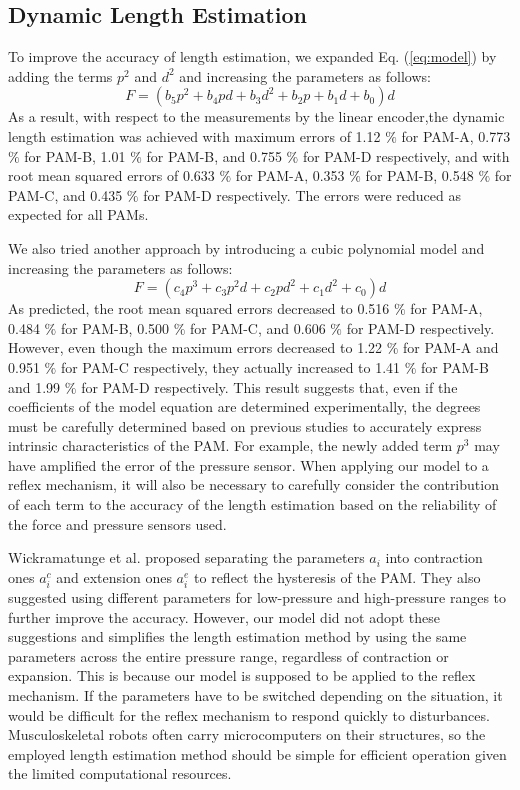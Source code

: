 \renewcommand{\thesubsection}{\Alph{subsection}}
\setcounter{subsection}{1} 
\subsection{Dynamic Length Estimation}
To improve the accuracy of length estimation, we expanded Eq. (\ref{eq:model}) by adding the terms $p^2$ and $d^2$ and increasing the parameters as follows:
\begin{equation}
\label{eq:model_2d(1)}
F = (b_5p^2 + b_4pd + b_3d^2 + b_2p+b_1d+b_0)d
\end{equation}
As a result, with respect to the measurements by the linear encoder,the dynamic length estimation was achieved with maximum errors of 1.12 $\%$ for PAM-A, 0.773 $\%$ for PAM-B, 1.01 $\%$ for PAM-B, and 0.755 $\%$ for PAM-D respectively, and with root mean squared errors of 0.633 $\%$ for PAM-A, 0.353 $\%$ for PAM-B, 0.548 $\%$ for PAM-C, and 0.435 $\%$ for PAM-D respectively. The errors were reduced as expected for all PAMs. 

We also tried another approach by introducing a cubic polynomial model and increasing the parameters as follows:
\begin{equation}
    \label{eq:model_3d}
    F = (c_4p^3+c_3p^2d+c_2pd^2+c_1d^2+c_0)d
\end{equation}
As predicted, the root mean squared errors decreased to 0.516 $\%$ for PAM-A, 0.484 $\%$ for PAM-B, 0.500 $\%$ for PAM-C, and 0.606 $\%$ for PAM-D respectively. 
However, even though the maximum errors decreased to 1.22 $\%$ for PAM-A and 0.951 $\%$ for PAM-C respectively, they actually increased to 1.41 $\%$ for PAM-B and 1.99 $\%$ for PAM-D respectively. This result suggests that, even if the coefficients of the model equation are determined experimentally, the degrees must be carefully determined based on previous studies to accurately express intrinsic characteristics of the PAM. For example, the newly added term $p^3$ may have amplified the error of the pressure sensor. When applying our model to a reflex mechanism, it will also be necessary to carefully consider the contribution of each term to the accuracy of the length estimation based on the reliability of the force and pressure sensors used.

Wickramatunge et al. proposed separating the parameters $a_i$ into contraction ones $a^c_i$ and extension ones $a^e_i$ to reflect the hysteresis of the PAM\cite{spring}. They also suggested using different parameters for low-pressure and high-pressure ranges to further improve the accuracy. However, our model did not adopt these suggestions and simplifies the length estimation method by using the same parameters across the entire pressure range, regardless of contraction or expansion. This is because our model is supposed to be applied to the reflex mechanism. If the parameters have to be switched depending on the situation, it would be difficult for the reflex mechanism to respond quickly to disturbances. Musculoskeletal robots often carry microcomputers on their structures, so the employed length estimation method should be simple for efficient operation given the limited computational resources.



